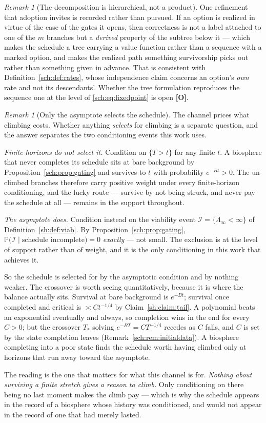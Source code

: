 \documentclass[11pt]{article}
\numberwithin{equation}{section}
\theoremstyle{plain}
\theoremstyle{definition}
\theoremstyle{remark}
\newtheorem{remark}[theorem]{Remark}
\newcommand{\PP}{\mathbb{P}}
\newcommand{\Imm}{\mathcal{I}}
\begin{document}
\begin{remark}[The decomposition is hierarchical, not a product]
One refinement that adoption invites is recorded rather than pursued. If
an option is realized in virtue of the ease of the gates it opens, then
correctness is not a label attached to one of the $m$ branches but a
\emph{derived} property of the subtree below it --- which makes the
schedule a tree carrying a value function rather than a sequence with a
marked option, and makes the realized path something survivorship picks
out rather than something given in advance. That is consistent with
Definition~\ref{sch:def:rates}, whose independence claim concerns an
option's \emph{own} rate and not its descendants'. Whether the tree
formulation reproduces the sequence one at the level of
\eqref{sch:eq:fixedpoint} is open \textbf{[O]}.
\end{remark}

\begin{remark}[Only the asymptote selects the schedule]
\label{sch:rem:asymptote}
The channel prices what climbing costs. Whether anything \emph{selects}
for climbing is a separate question, and the answer separates the two
conditioning events this work uses.

\emph{Finite horizons do not select it.} Condition on $\{T>t\}$ for any
finite $t$. A biosphere that never completes its schedule sits at bare
background by Proposition~\ref{sch:prop:gating} and survives to $t$ with
probability $e^{-Bt}>0$. The un-climbed branches therefore carry
positive weight under every finite-horizon conditioning, and the lucky
route --- survive by not being struck, and never pay the schedule at all
--- remains in the support throughout.

\emph{The asymptote does.} Condition instead on the viability event
$\Imm=\{\Lambda_\infty<\infty\}$ of Definition~\ref{sh:def:viab}. By
Proposition~\ref{sch:prop:gating},
$\PP\bigl(\Imm\mid\text{schedule incomplete}\bigr)=0$ \emph{exactly} ---
not small. The exclusion is at the level of support rather than of
weight, and it is the only conditioning in this work that achieves it.

So the schedule is selected for by the asymptotic condition and by
nothing weaker. The crossover is worth seeing quantitatively, because it
is where the balance actually sits. Survival at bare background is
$e^{-Bt}$; survival once completed and critical is $\asymp Ct^{-1/4}$ by
Claim~\ref{sh:claim:tail}. A polynomial beats an exponential eventually
and always, so completion wins in the end for every $C>0$; but the
crossover $T_\ast$ solving $e^{-BT}=CT^{-1/4}$ recedes as $C$ falls, and
$C$ is set by the state completion leaves
(Remark~\ref{sch:rem:initialdata}). A biosphere completing into a poor
state finds the schedule worth having climbed only at horizons that run
away toward the asymptote.

The reading is the one that matters for what this channel is for.
\emph{Nothing about surviving a finite stretch gives a reason to climb.}
Only conditioning on there being no last moment makes the climb pay ---
which is why the schedule appears in the record of a biosphere whose
history was conditioned, and would not appear in the record of one that
had merely lasted.
\end{remark}
\end{document}
